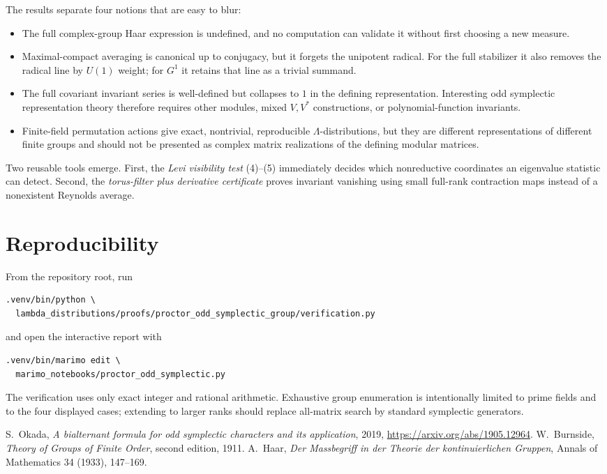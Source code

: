\documentclass[11pt]{article}
\begin{document}
The results separate four notions that are easy to blur:
\begin{itemize}[leftmargin=*,itemsep=3pt]
\item The full complex-group Haar expression is undefined, and no computation
can validate it without first choosing a new measure.
\item Maximal-compact averaging is canonical up to conjugacy, but it forgets
the unipotent radical. For the full stabilizer it also removes the radical
line by $U(1)$ weight; for $G^1$ it retains that line as a trivial summand.
\item The full covariant invariant series is well-defined but collapses to $1$
in the defining representation. Interesting odd symplectic representation
theory therefore requires other modules, mixed $V,V^*$ constructions, or
polynomial-function invariants.
\item Finite-field permutation actions give exact, nontrivial, reproducible
$\Lambda$-distributions, but they are different representations of different
finite groups and should not be presented as complex matrix realizations of
the defining modular matrices.
\end{itemize}

Two reusable tools emerge. First, the \emph{Levi visibility test} (4)--(5)
immediately decides which nonreductive coordinates an eigenvalue statistic can
detect. Second, the \emph{torus-filter plus derivative certificate} proves
invariant vanishing using small full-rank contraction maps instead of a
nonexistent Reynolds average.

\section{Reproducibility}

From the repository root, run
\begin{verbatim}
.venv/bin/python \
  lambda_distributions/proofs/proctor_odd_symplectic_group/verification.py
\end{verbatim}
and open the interactive report with
\begin{verbatim}
.venv/bin/marimo edit \
  marimo_notebooks/proctor_odd_symplectic.py
\end{verbatim}
The verification uses only exact integer and rational arithmetic. Exhaustive
group enumeration is intentionally limited to prime fields and to the four
displayed cases; extending to larger ranks should replace all-matrix search by
standard symplectic generators.

\begin{thebibliography}{9}
S.~Okada, \emph{A bialternant formula for odd symplectic characters and its
application}, 2019, \url{https://arxiv.org/abs/1905.12964}.
\bibitem{Burnside}
W.~Burnside, \emph{Theory of Groups of Finite Order}, second edition, 1911.
\bibitem{Haar}
A.~Haar, \emph{Der Massbegriff in der Theorie der kontinuierlichen Gruppen},
Annals of Mathematics 34 (1933), 147--169.
\end{thebibliography}
\end{document}

